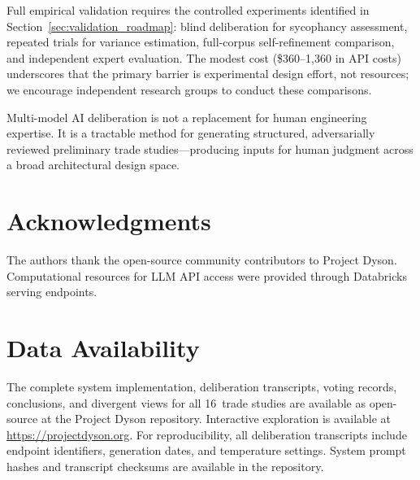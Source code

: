 \documentclass[11pt,a4paper]{article}
\begin{document}
Full empirical validation requires the controlled experiments identified in Section~\ref{sec:validation_roadmap}: blind deliberation for sycophancy assessment, repeated trials for variance estimation, full-corpus self-refinement comparison, and independent expert evaluation. The modest cost (\$360--1{,}360 in API costs) underscores that the primary barrier is experimental design effort, not resources; we encourage independent research groups to conduct these comparisons.

Multi-model AI deliberation is not a replacement for human engineering expertise. It is a tractable method for generating structured, adversarially reviewed preliminary trade studies---producing inputs for human judgment across a broad architectural design space.

\section*{Acknowledgments}

The authors thank the open-source community contributors to Project Dyson. Computational resources for LLM API access were provided through Databricks serving endpoints.

\section*{Data Availability}

The complete system implementation, deliberation transcripts, voting records, conclusions, and divergent views for all 16~trade studies are available as open-source at the Project Dyson repository. Interactive exploration is available at \url{https://projectdyson.org}. For reproducibility, all deliberation transcripts include endpoint identifiers, generation dates, and temperature settings. System prompt hashes and transcript checksums are available in the repository.
\end{document}
